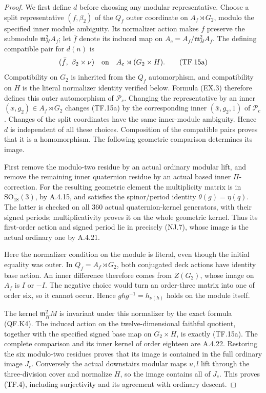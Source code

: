 \begin{proof}
We first define \(d\) before choosing any modular
representative. Choose a split representative
\((f,\beta_2)\) of the \(Q_f\) outer coordinate
on \(A_f\rtimes G_2\), modulo the specified inner
module ambiguity. Its normalizer action makes
\(f\) preserve the submodule
\(\mathfrak m_H^2A_f\); let \(\bar f\) denote
its induced map on \(A_c=A_f/\mathfrak m_H^2A_f\).
The defining compatible pair for \(d(n)\) is
\[
                  (\bar f,\ \beta_2\times\nu)
       \quad\hbox{on}\quad A_c\rtimes(G_2\times H).
 \tag{TF.15a}
\]
Compatibility on \(G_2\) is inherited from the
\(Q_f\) automorphism, and compatibility on \(H\)
is the literal normalizer identity verified below.
Formula (EX.3) therefore defines this outer
automorphism of \(\mathcal P_c\).
Changing the representative by an inner
\((x,g_2)\in A_f\rtimes G_2\) changes (TF.15a)
by the corresponding inner
\((\bar x,g_2,1)\) of \(\mathcal P_c\).
Changes of the split coordinates have the same
inner-module ambiguity. Hence \(d\) is independent
of all these choices. Composition of the compatible
pairs proves that it is a homomorphism.
The following geometric comparison determines
its image.

First remove the modulo-two residue by an actual
ordinary modular lift, and remove the remaining
inner quaternion residue by an actual based inner
\(\Pi\)-correction. For the resulting geometric
element the multiplicity matrix is in
\(\mathrm{SO}_{18}^-(3)\), by A.4.15, and satisfies
the spinor/period identity \(\theta(g)=\eta(q)\).
The latter is checked on all 360 actual
quaternion-kernel generators, with their signed
periods; multiplicativity proves it on the whole
geometric kernel. Thus its first-order action and
signed period lie in precisely (NJ.7), whose image
is the actual ordinary one by A.4.21.

Here the normalizer condition on the module is
literal, even though the initial equality was outer.
In \(Q_f=A_f\rtimes G_2\), both conjugated deck
actions have identity base action. An inner difference
therefore comes from \(Z(G_2)\), whose image on
\(A_f\) is \(I\) or \(-I\). The negative choice
would turn an order-three matrix into one of order
six, so it cannot occur. Hence
\(g h g^{-1}=h_{\nu(h)}\) holds on the module itself.

The kernel \(\mathfrak m_H^2M\) is invariant under
this normalizer by the exact formula (QF.K4).
The induced action on the twelve-dimensional faithful
quotient, together with the specified signed base map
on \(G_2\times H\), is exactly (TF.15a).
The complete comparison and its inner kernel of
order eighteen are A.4.22. Restoring the six
modulo-two residues proves that its image is contained
in the full ordinary image \(J_c\).
Conversely the actual downstairs modular maps
\(u,l\) lift through the three-division cover and
normalize \(H\), so the image contains all of \(J_c\).
This proves (TF.4), including surjectivity and its
agreement with ordinary descent.


\end{proof}
